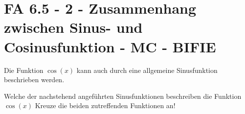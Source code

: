 \section{FA 6.5 - 2 - Zusammenhang zwischen Sinus- und Cosinusfunktion - MC - BIFIE}

\begin{beispiel}[FA 6.5]{1} %
				Die Funktion $\cos(x)$ kann auch durch eine allgemeine Sinusfunktion beschrieben werden.

Welche der nachstehend angeführten Sinusfunktionen beschreiben die Funktion $\cos(x)$
Kreuze die beiden zutreffenden Funktionen an!

\end{beispiel}